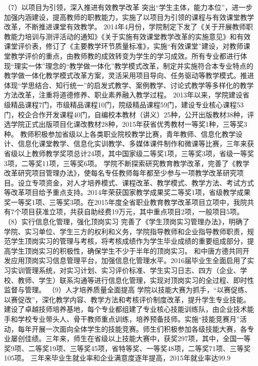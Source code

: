 （7）以项目为引领，深入推进有效教学改革
突出“学生主体，能力本位”，进一步加强内涵建设，提高教师的职教能力，实施了以项目为引领的课程与有效课堂教学改革，不断推进课堂有效教学。
2014年4月份，学院制定下发了《关于开展教师职教能力培训与测评活动的通知》《关于实施有效课堂教学改革的实施意见》和有效课堂评价表，修订了《主要教学环节质量标准》，实施“有效课堂”建设，对教师课堂教学评价的重点，由教师教的成效转变为学生的学习成效。所有专业都进行体现“理实一体”理念的“教学做一体化”教学模式改革，制定并实施符合本专业特点的教学做一体化教学模式改革方案，灵活采用项目导向、任务驱动等教学模式。推进体现“学思结合、知行统一”的启发式教学、案例教学、讨论式教学等多样化的教学方法改革，注重将道德修养、职业素养融入教学过程。
2013年以来，学院建设省级精品课程7门，市级精品课程10门，院级精品课程59门，建设专业核心课程53门，校企合作开发课程40门，自编校本教材（讲义）25种，公开出版教材38种，评选学院正式出版项目化课改教材28种，2015年获省优秀教材一等奖1种，三等奖3种。
教师积极参加省级以上各类职业院校教学比赛，青年教师、信息化教学设计、信息化课堂教学、信息化实训教学、多媒体课件制作和微课等比赛，三年来获省级以上教师教学奖项总计24项，其中国家级二等奖1项，三等奖3项，省级一等奖3项，二等奖11项，三等奖6项。
学院不断探索研究教育教学改革，完善了《教学改革研究项目管理办法》，使每名专任教师每年都至少参与一项教学改革研究项目。设立专项资金，对人才培养模式、课程改革、教学模式、教学方法、考试方式等改革项目给予重点支持。2014年荣获国家教学成果奖二等奖1项，省级教学成果奖一等奖1项、三等奖3项。在2015年度全省职业教育教学改革项目立项中，我院共有7个项目获准立项，共获自助经费19万元，其中重点项目2项，一般项目5项。
（8）实行信息化管理，强化顶岗实习
完善了《学生顶岗实习管理办法》，明确了学院、实习单位、学生三方的权利和义务，学院指导教师和企业指导教师职责，规范学生顶岗实习的管理与考核，将考核成绩作为学生毕业成绩的重要组成部分，提高学生顶岗实习的积极性，确保学生不少于半年的顶岗实习。
和中唐方德共同开发应用顶岗实习信息管理平台，加强信息化管理水平。2016届毕业生全面启用了实习实训管理系统，对实习计划、实习评价标准、学生实习日志、四方（企业、学校、教师、学生）联系沟通等进行信息化管理，实现对顶岗实习的全过程、即时性监督与管理。
（9）人才培养质量全面提高
学院以技能大赛为抓手，“以赛促练、以赛促改”，深化教学内容、教学方法和考核评价制度改革，提升学生专业技能。建设了卓越技师培养基地，每个专业都组建了专业核心技能训练队，由企业技术能手和学校专业带头人、骨干教师重点训练，培养预备技师。实施“技能竞赛月”活动，每年开展一次面向全体学生的技能竞赛。师生们积极参加各级技能大赛，各专业屡创佳绩。三年来，师生在省级以上技能大赛中，获奖297项，其中，全国一等奖9项、二等奖19项、三等奖45项，省特等奖、一等奖48项，二等奖71项、三等奖105项。
三年来毕业生就业率和企业满意度逐年提高，2015年就业率达99.9%
